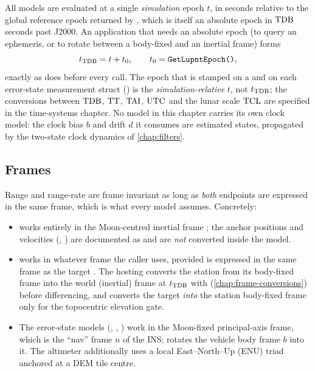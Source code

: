 All models are evaluated at a single \emph{simulation} epoch $t$, in seconds
relative to the global reference epoch returned by , which
is itself an absolute epoch in $\mathrm{TDB}$ seconds past J2000. An application that
needs an absolute epoch (to query an ephemeris, or to rotate between a
body-fixed and an inertial frame) forms
\begin{equation}
  t_{\mathrm{TDB}} = t + t_0, \qquad t_0 = \texttt{GetLupntEpoch()},
  \label{eq:meas-epoch}
\end{equation}
exactly as  does before every
 call. The epoch that is stamped on a  and on
each error-state measurement struct () is the
\emph{simulation-relative} $t$, not $t_{\mathrm{TDB}}$; the conversions between $\mathrm{TDB}$,
$\mathrm{TT}$, $\mathrm{TAI}$, $\mathrm{UTC}$ and the lunar scale $\mathrm{TCL}$ are specified in the
time-systems chapter. No model in this chapter carries its own clock model: the
clock bias $b$ and drift $d$ it consumes are estimated states, propagated by
the two-state clock dynamics of \cref{chap:filters}.

\subsection{Frames}
\label{sec:meas-frames}

Range and range-rate are frame invariant as long as \emph{both} endpoints are
expressed in the same frame, which is what every model assumes. Concretely:

\begin{itemize}[leftmargin=1.4em]
  \item {} works entirely in the Moon-centred
    inertial frame ; the anchor positions and velocities
    (, ) are documented as
     and are \emph{not} converted inside the model.
  \item {} works in whatever frame the caller
    uses, provided  is expressed in the same
    frame as the target . The hosting
     converts the station from its body-fixed
    frame into the world (inertial) frame at $t_{\mathrm{TDB}}$ with 
    (\cref{chap:frame-conversions}) before differencing, and converts the
    target \emph{into} the station body-fixed frame only for the topocentric
    elevation gate.
  \item The error-state models (,
    , ) work in
    the Moon-fixed principal-axis frame, which is the ``nav'' frame $n$ of the
    INS;  rotates the vehicle body frame $b$ into
    it. The altimeter additionally uses a local East--North--Up (ENU) triad
    anchored at a DEM tile centre.
\end{itemize}

